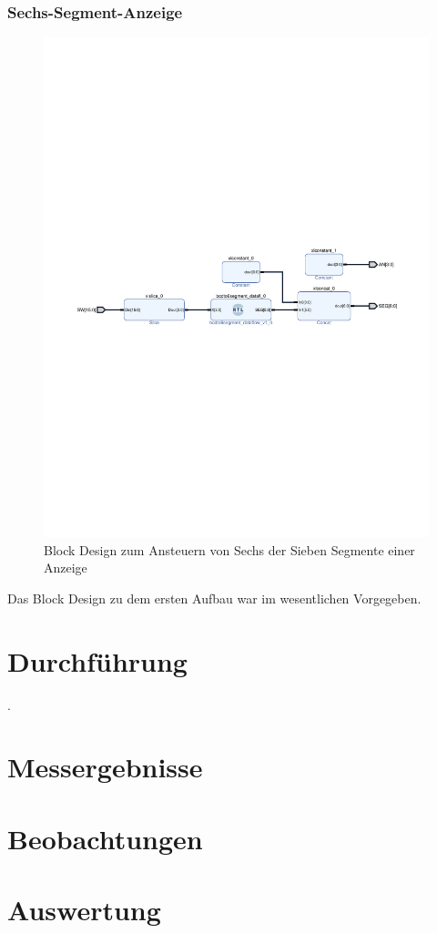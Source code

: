 \documentclass[11pt, a4paper]{article}
\begin{document}
\subsubsection*{Sechs-Segment-Anzeige}
\begin{figure}[htb]    
    \centering
    \includegraphics[width=\linewidth]{versuch1Data/seven_segment_display1.pdf}
    \caption{Block Design zum Ansteuern von Sechs der Sieben Segmente einer Anzeige}
    \label{aufbauSechsSegment}        
\end{figure}
Das Block Design zu dem ersten Aufbau war im wesentlichen Vorgegeben.
\section*{Durchführung}. 
\section*{Messergebnisse}
\section*{Beobachtungen}
\section*{Auswertung}
\end{document}
